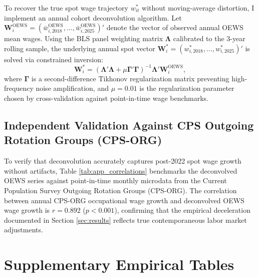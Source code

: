 \documentclass[12pt]{article}
\begin{document}
To recover the true spot wage trajectory $w_{it}^*$ without moving-average distortion, I implement an annual cohort deconvolution algorithm. Let $\mathbf{W}_i^{\text{OEWS}} = (\bar{w}_{i, 2018}^{\text{OEWS}}, \dots, \bar{w}_{i, 2025}^{\text{OEWS}})'$ denote the vector of observed annual OEWS mean wages. Using the BLS panel weighting matrix $\mathbf{\Lambda}$ calibrated to the 3-year rolling sample, the underlying annual spot vector $\mathbf{W}_i^* = (w_{i, 2018}^*, \dots, w_{i, 2025}^*)'$ is solved via constrained inversion:
\begin{equation}
\mathbf{W}_i^* = \left( \mathbf{\Lambda}' \mathbf{\Lambda} + \mu \mathbf{\Gamma}' \mathbf{\Gamma} \right)^{-1} \mathbf{\Lambda}' \mathbf{W}_i^{\text{OEWS}},
\end{equation}
where $\mathbf{\Gamma}$ is a second-difference Tikhonov regularization matrix preventing high-frequency noise amplification, and $\mu = 0.01$ is the regularization parameter chosen by cross-validation against point-in-time wage benchmarks.

\subsection{Independent Validation Against CPS Outgoing Rotation Groups (CPS-ORG)}

To verify that deconvolution accurately captures post-2022 spot wage growth without artifacts, Table \ref{tab:app_correlations} benchmarks the deconvolved OEWS series against point-in-time monthly microdata from the Current Population Survey Outgoing Rotation Groups (CPS-ORG). The correlation between annual CPS-ORG occupational wage growth and deconvolved OEWS wage growth is $r = 0.892$ ($p < 0.001$), confirming that the empirical deceleration documented in Section \ref{sec:results} reflects true contemporaneous labor market adjustments.

\newpage
\section{Supplementary Empirical Tables}
\label{app:tables}
\end{document}
